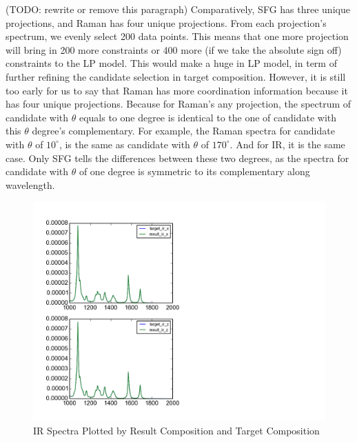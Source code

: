 (TODO: rewrite or remove this paragraph) Comparatively, SFG has three unique projections, and Raman has four unique projections. From each projection's spectrum, we evenly select 200 data points. This means that one more projection will bring in 200 more constraints or 400 more (if we take the absolute sign off) constraints to the LP model. This would make a huge in LP model, in term of further refining the candidate selection in target composition. However, it is still too early for us to say that Raman has more coordination information because it has four unique projections. Because for Raman's any projection, the spectrum of candidate with $\theta$ equals to one degree is identical to the one of candidate with this $\theta$ degree's complementary. For example, the Raman spectra for candidate with $\theta$ of $10^{\circ}$, is the same as candidate with $\theta$ of $170^{\circ}$. And for IR, it is the same case. Only SFG tells the differences between these two degrees, as the spectra for candidate with $\theta$ of one degree is symmetric to its complementary along wavelength. \\

\begin{figure}[!ht] \label{fig:5.2}
\centering
\includegraphics[scale=0.7]{Figures/result_target_plotting_ir16.png}
\caption{IR Spectra Plotted by Result Composition and Target Composition} 
\end{figure}


